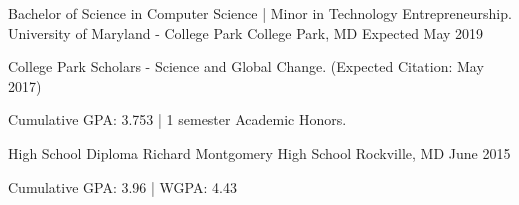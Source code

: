 

\begin{cventries}

  \cventry
    {Bachelor of Science in Computer Science  |  Minor in Technology Entrepreneurship.} %
    {University of Maryland - College Park} %
    {College Park, MD} %
    {Expected May 2019} %
    {
      \begin{cvitems} %
          \item {College Park Scholars - Science and Global Change. (Expected Citation: May 2017)}
          \item {Cumulative GPA: 3.753 | 1 semester Academic Honors.}
      \end{cvitems}
    }
    
    \cventry
    {High School Diploma} %
    {Richard Montgomery High School} %
    {Rockville, MD} %
    {June 2015} %
    {
      \begin{cvitems} %
         \item {Cumulative GPA: 3.96 | WGPA: 4.43}
      \end{cvitems}
    }

\end{cventries}
